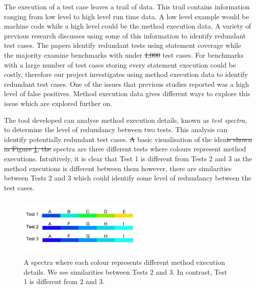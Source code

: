 \documentclass[11pt
              , a4paper
              , twoside
              , openright
              ]{report}
\providecommand{\DIFadd}[1]{{\protect\color{blue}\uwave{#1}}} %
\providecommand{\DIFdel}[1]{{\protect\color{red}\sout{#1}}}                      %
\providecommand{\DIFaddbegin}{} %
\providecommand{\DIFaddend}{} %
\providecommand{\DIFdelbegin}{} %
\providecommand{\DIFdelend}{} %
\begin{document}
The execution of a test case leaves a trail of data. This trail contains information ranging from low level to high level run time data. A low level example would be machine code while a high level could be the method execution data. A variety of previous research \cite{wong1995effect, wong1999test, rothermel1998empirical, rothermel2002empirical,koochakzadeh2009test,zhang2011empirical,li2008static} discusses using some of this information to identify redundant test cases. The papers identify redundant tests using statement coverage while the majority examine benchmarks with under \DIFdelbegin \DIFdel{1,000 }\DIFdelend \DIFaddbegin \DIFadd{200 }\DIFaddend test cases. For benchmarks with a large number of test cases storing every statement execution could be costly, therefore our project investigates using method execution data to identify redundant test cases. One of the issues that previous studies reported was a high level of false positives. Method execution data gives different ways to explore this issue which are explored further on. 

The tool developed can analyse method execution details, known as \textit{test spectra}, to determine the level of redundancy between two tests. This analysis can identify potentially redundant test cases. \DIFdelbegin \DIFdel{A }\DIFdelend \DIFaddbegin \DIFadd{Figure \ref{fig:spectra} shows a }\DIFaddend basic visualisation of the idea\DIFdelbegin \DIFdel{is shown in Figure \ref{fig:spectra}, the }\DIFdelend \DIFaddbegin \DIFadd{. The }\DIFaddend spectra are three different tests where colours represent method executions. Intuitively, it is clear that Test 1 is different from Tests 2 and 3 as the method executions is different between them however, there are similarities between Tests 2 and 3 which could identify some level of redundancy between the test cases. 

\begin{figure}[h]
\centering
\includegraphics[width=6cm,height=3cm]{spectra.png}
\caption{A spectra where each colour represents different method execution details. We see similarities between Tests 2 and 3. In contrast, Test 1 is different from 2 and 3. }
\label{fig:spectra}
\end{figure}
\end{document}

